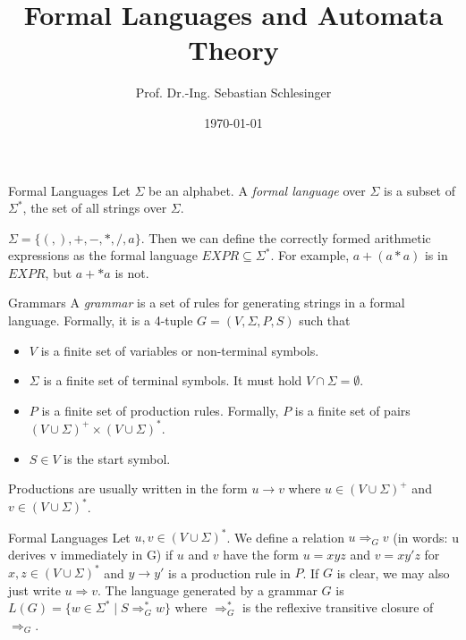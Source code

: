 \documentclass{beamer}
\title[Formal Languages and Automata Theory]{Formal Languages and Automata Theory}
\author[Sebastian Schlesinger]{Prof. Dr.-Ing. Sebastian Schlesinger}
\institute[HWR Berlin]{Berlin School for Economics and Law}
\date{\today}
\begin{document}
 \begin{frame}
\titlepage
\end{frame}




\begin{frame}{Formal Languages}
Let $\Sigma$ be an alphabet. A \textit{formal language} over $\Sigma$ is a subset of $\Sigma^*$, the set of all strings over $\Sigma$.

\begin{example}
    $\Sigma=\{(,),+,-,*,/,a\}$. Then we can define the correctly formed arithmetic expressions as the formal language $EXPR\subseteq \Sigma^*$. For example, $a+(a*a)$ is in $EXPR$, but $a+*a$ is not.
\end{example}
\end{frame}

\begin{frame}{Grammars}
    A \textit{grammar} is a set of rules for generating strings in a formal language. Formally, it is a 4-tuple $G=(V,\Sigma,P,S)$ such that 
    \begin{itemize}
        \item $V$ is a finite set of variables or non-terminal symbols.
        \item $\Sigma$ is a finite set of terminal symbols. It must hold $V\cap \Sigma = \emptyset$.
        \item $P$ is a finite set of production rules. Formally, $P$ is a finite set of pairs $(V\cup \Sigma)^+\times (V\cup \Sigma)^*$.
        \item $S\in V$ is the start symbol.
    \end{itemize}

    Productions are usually written in the form $u\rightarrow v$ where $u\in (V\cup \Sigma)^+$ and $v\in (V\cup \Sigma)^*$.
\end{frame}

\begin{frame}{Formal Languages}
    Let $u,v\in (V\cup \Sigma)^*$. We define a relation $u\Rightarrow_G v$ (in words: u derives v immediately in G) if $u$ and $v$ have the form
    \vspace{0.5cm}
    $u=xyz$ and $v=xy'z$ for $x,z\in (V\cup \Sigma)^*$ and $y\to y'$ is a production rule in $P$. If $G$ is clear, we may also just write $u\Rightarrow v$.
    \vspace{0.5cm}
    The language generated by a grammar $G$ is $L(G)=\{w\in \Sigma^*\mid S\Rightarrow^*_G w\}$ where $\Rightarrow^*_G$ is the reflexive transitive closure of $\Rightarrow_G$.
    
\end{frame}
\end{document}
